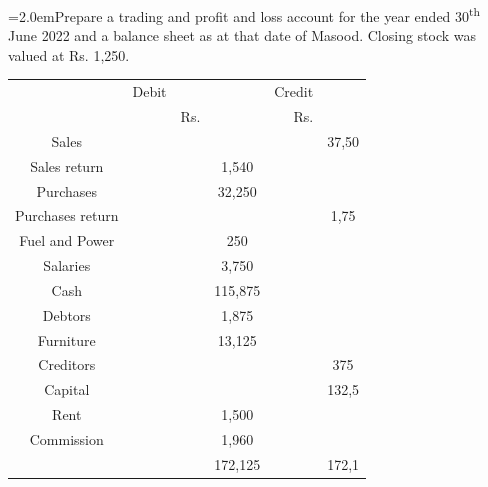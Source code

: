 \documentclass[11pt,a4paper]{article}
\newcommand{\lqn}[2]{\Needspace{6\baselineskip}\par\medskip\noindent\hangindent=2.0em\hangafter=1\makebox[2.0em][l]{\textbf{#1.}}#2\par}
\begin{document}
\lqn{90}{Prepare a trading and profit and loss account for the year ended 30\textsuperscript{th} June 2022 and a balance sheet as at that date of Masood. Closing stock was valued at Rs. 1,250.\par
\par\smallskip\noindent\hspace*{1.2em}\begin{tabular}{|ccccrc|}
\hline
 & Debit &  &  & Credit &  \\
 &  & Rs. &  & Rs. &  \\
Sales &  &  &  &  & 37,50 \\
Sales return &  &  & 1,540 &  &  \\
Purchases &  &  & 32,250 &  &  \\
Purchases return &  &  &  &  & 1,75 \\
Fuel and Power &  &  & 250 &  &  \\
Salaries &  &  & 3,750 &  &  \\
Cash &  &  & 115,875 &  &  \\
Debtors &  &  & 1,875 &  &  \\
Furniture &  &  & 13,125 &  &  \\
Creditors &  &  &  &  & 375 \\
Capital &  &  &  &  & 132,5 \\
Rent &  &  & 1,500 &  &  \\
Commission &  &  & 1,960 &  &  \\
 &  &  & 172,125 &  & 172,1 \\
\hline
\end{tabular}\par\smallskip
}
\end{document}
